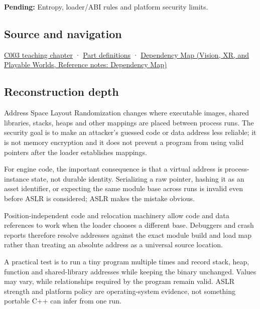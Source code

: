 \textbf{Pending:} Entropy, loader/ABI rules and platform security limits.

\subsection{Source and navigation}\label{appendix-78cb248c8355-source-and-navigation}

\hyperref[01-foundations-i-ch002-where-the-bytes-live]{C003 teaching chapter} · \hyperref[appendix-fd090d982a15-m003---parts-41-60]{Part definitions} · \href{../07-Vision-XR-and-Playable-Worlds/main.pdf\#nameddest=appendix-4ad47bdd269a}{Dependency Map (Vision, XR, and Playable Worlds, Reference notes: Dependency Map)}

\subsection{Reconstruction depth}\label{appendix-78cb248c8355-reconstruction-depth}

Address Space Layout Randomization changes where executable images, shared libraries, stacks, heaps and other mappings are placed between process runs. The security goal is to make an attacker's guessed code or data address less reliable; it is not memory encryption and it does not prevent a program from using valid pointers after the loader establishes mappings.

For engine code, the important consequence is that a virtual address is process-instance state, not durable identity. Serializing a raw pointer, hashing it as an asset identifier, or expecting the same module base across runs is invalid even before ASLR is considered; ASLR makes the mistake obvious.

Position-independent code and relocation machinery allow code and data references to work when the loader chooses a different base. Debuggers and crash reports therefore resolve addresses against the exact module build and load map rather than treating an absolute address as a universal source location.

A practical test is to run a tiny program multiple times and record stack, heap, function and shared-library addresses while keeping the binary unchanged. Values may vary, while relationships required by the program remain valid. ASLR strength and platform policy are operating-system evidence, not something portable C++ can infer from one run.
